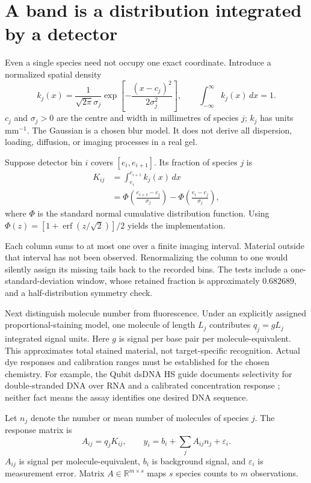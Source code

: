 \section{A band is a distribution integrated by a detector}
Even a single species need not occupy one exact coordinate. Introduce a normalized spatial density
\begin{equation}
k_j(x)=\frac{1}{\sqrt{2\pi}\sigma_j}
\exp\left[-\frac{(x-c_j)^2}{2\sigma_j^2}\right],
\qquad \int_{-\infty}^{\infty}k_j(x)\,dx=1.
\end{equation}
$c_j$ and $\sigma_j>0$ are the centre and width in millimetres of species $j$; $k_j$ has units $\mathrm{mm}^{-1}$. The Gaussian is a chosen blur model. It does not derive all dispersion, loading, diffusion, or imaging processes in a real gel.

Suppose detector bin $i$ covers $[e_i,e_{i+1}]$. Its fraction of species $j$ is
\begin{align}
K_{ij}&=\int_{e_i}^{e_{i+1}}k_j(x)\,dx\\
&=\Phi\left(\frac{e_{i+1}-c_j}{\sigma_j}\right)
-\Phi\left(\frac{e_i-c_j}{\sigma_j}\right), \label{eq:bin}
\end{align}
where $\Phi$ is the standard normal cumulative distribution function.
Using $\Phi(z)=[1+\operatorname{erf}(z/\sqrt2)]/2$ yields the implementation.

Each column sums to at most one over a finite imaging interval. Material outside that interval has not been observed. Renormalizing the column to one would silently assign its missing tails back to the recorded bins. The tests include a one-standard-deviation window, whose retained fraction is approximately $0.682689$, and a half-distribution symmetry check.

Next distinguish molecule number from fluorescence. Under an explicitly assigned proportional-staining model, one molecule of length $L_j$ contributes $q_j=gL_j$ integrated signal units. Here $g$ is signal per base pair per molecule-equivalent. This approximates total stained material, not target-specific recognition. Actual dye responses and calibration ranges must be established for the chosen chemistry. For example, the Qubit dsDNA HS guide documents selectivity for double-stranded DNA over RNA and a calibrated concentration response \cite{qubit}; neither fact means the assay identifies one desired DNA sequence.

Let $n_j$ denote the number or mean number of molecules of species $j$. The response matrix is
\begin{equation}
A_{ij}=q_jK_{ij},\qquad
y_i=b_i+\sum_j A_{ij}n_j+\varepsilon_i. \label{eq:forward}
\end{equation}
$A_{ij}$ is signal per molecule-equivalent, $b_i$ is background signal, and $\varepsilon_i$ is measurement error. Matrix $A\in\mathbb R^{m\times s}$ maps $s$ species counts to $m$ observations.


